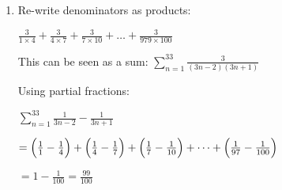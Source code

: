 \documentclass[../main.tex]{subfiles}
\begin{document}
\begin{enumerate}[itemsep=0.7cm]
    \item 
    Re-write denominators as products:

    $\frac{3}{1\times 4}+\frac{3}{4\times 7}+\frac{3}{7\times 10}+\dots +\frac{3}{979\times 100}$

    This can be seen as a sum:
    $\sum\limits_{n=1}^{33} \frac{3}{(3n-2)(3n+1)}$

    Using partial fractions:

    $\sum\limits_{n=1}^{33} \frac{1}{3n-2}-\frac{1}{3n+1}$

    $=\Bigl(\frac{1}{1}-\frac{1}{4}\Bigr)+\Bigl(\frac{1}{4}-\frac{1}{7}\Bigr)+\Bigl(\frac{1}{7}-\frac{1}{10}\Bigr)+\dots +\Bigl(\frac{1}{97}-\frac{1}{100}\Bigr)$

    $=1-\frac{1}{100}=\frac{99}{100}$


\end{enumerate}
\end{document}
